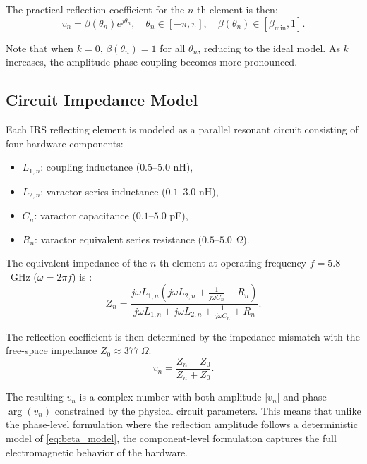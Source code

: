 \documentclass[12pt,a4paper]{article}
\begin{document}
The practical reflection coefficient for the $n$-th element is then:
\begin{equation}
    v_n = \beta(\theta_n) e^{j\theta_n}, \quad \theta_n \in [-\pi, \pi], \quad \beta(\theta_n) \in [\beta_{\min}, 1].
    \label{eq:reflection_coeff}
\end{equation}

Note that when $k = 0$, $\beta(\theta_n) = 1$ for all $\theta_n$, reducing to the ideal model. As $k$ increases, the amplitude-phase coupling becomes more pronounced.

\subsection{Circuit Impedance Model}
\label{sec:circuit_model}

Each IRS reflecting element is modeled as a parallel resonant circuit consisting of four hardware components:
\begin{itemize}
    \item $L_{1,n}$: coupling inductance ($0.5$--$5.0$ nH),
    \item $L_{2,n}$: varactor series inductance ($0.1$--$3.0$ nH),
    \item $C_n$: varactor capacitance ($0.1$--$5.0$ pF),
    \item $R_n$: varactor equivalent series resistance ($0.5$--$5.0$ $\Omega$).
\end{itemize}

The equivalent impedance of the $n$-th element at operating frequency $f = 5.8$~GHz ($\omega = 2\pi f$) is \cite{abeywickrama2020intelligent}:
\begin{equation}
    Z_n = \frac{j\omega L_{1,n} \left(j\omega L_{2,n} + \frac{1}{j\omega C_n} + R_n\right)}{j\omega L_{1,n} + j\omega L_{2,n} + \frac{1}{j\omega C_n} + R_n}.
    \label{eq:impedance}
\end{equation}

The reflection coefficient is then determined by the impedance mismatch with the free-space impedance $Z_0 \approx 377~\Omega$:
\begin{equation}
    v_n = \frac{Z_n - Z_0}{Z_n + Z_0}.
    \label{eq:reflection_from_impedance}
\end{equation}

The resulting $v_n$ is a complex number with both amplitude $|v_n|$ and phase $\arg(v_n)$ constrained by the physical circuit parameters. This means that unlike the phase-level formulation where the reflection amplitude follows a deterministic model of \eqref{eq:beta_model}, the component-level formulation captures the full electromagnetic behavior of the hardware.
\end{document}
